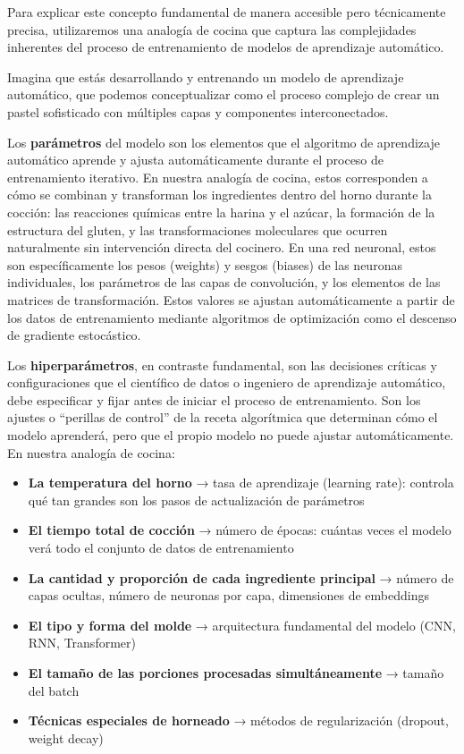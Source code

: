 Para explicar este concepto fundamental de manera accesible pero técnicamente precisa, utilizaremos una analogía de cocina que captura las complejidades inherentes del proceso de entrenamiento de modelos de aprendizaje automático.

Imagina que estás desarrollando y entrenando un modelo de aprendizaje automático, que podemos conceptualizar como el proceso complejo de crear un pastel sofisticado con múltiples capas y componentes interconectados.

Los \textbf{parámetros} del modelo son los elementos que el algoritmo de aprendizaje automático aprende y ajusta automáticamente durante el proceso de entrenamiento iterativo. En nuestra analogía de cocina, estos corresponden a cómo se combinan y transforman los ingredientes dentro del horno durante la cocción: las reacciones químicas entre la harina y el azúcar, la formación de la estructura del gluten, y las transformaciones moleculares que ocurren naturalmente sin intervención directa del cocinero. En una red neuronal, estos son específicamente los pesos (weights) y sesgos (biases) de las neuronas individuales, los parámetros de las capas de convolución, y los elementos de las matrices de transformación. Estos valores se ajustan automáticamente a partir de los datos de entrenamiento mediante algoritmos de optimización como el descenso de gradiente estocástico.

Los \textbf{hiperparámetros}, en contraste fundamental, son las decisiones críticas y configuraciones que el científico de datos o ingeniero de aprendizaje automático, debe especificar y fijar antes de iniciar el proceso de entrenamiento. Son los ajustes o ``perillas de control'' de la receta algorítmica que determinan cómo el modelo aprenderá, pero que el propio modelo no puede ajustar automáticamente. En nuestra analogía de cocina:

\begin{itemize}
    \item \textbf{La temperatura del horno} → tasa de aprendizaje (learning rate): controla qué tan grandes son los pasos de actualización de parámetros
    \item \textbf{El tiempo total de cocción} → número de épocas: cuántas veces el modelo verá todo el conjunto de datos de entrenamiento
    \item \textbf{La cantidad y proporción de cada ingrediente principal} → número de capas ocultas, número de neuronas por capa, dimensiones de embeddings
    \item \textbf{El tipo y forma del molde} → arquitectura fundamental del modelo (CNN, RNN, Transformer)
    \item \textbf{El tamaño de las porciones procesadas simultáneamente} → tamaño del batch
    \item \textbf{Técnicas especiales de horneado} → métodos de regularización (dropout, weight decay)
\end{itemize}

